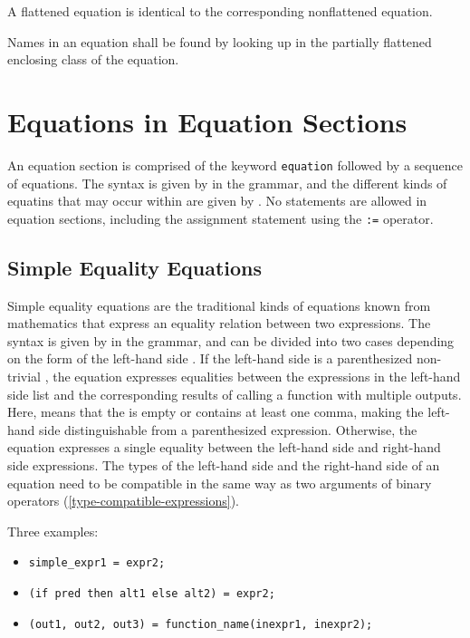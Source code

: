 A flattened equation is identical to the corresponding nonflattened equation.

Names in an equation shall be found by looking up in the partially flattened enclosing class of the equation.


\section{Equations in Equation Sections}\label{equations-in-equation-sections}

An equation section is comprised of the keyword \lstinline!equation! followed by a sequence of equations.
The syntax is given by  in the grammar, and the different kinds of equatins that may occur within are given by .
No statements are allowed in equation sections, including the assignment statement using the \lstinline!:=! operator.


\subsection{Simple Equality Equations}\label{simple-equality-equations}

Simple equality equations are the traditional kinds of equations known from mathematics that express an equality relation between two expressions.
The syntax is given by  in the grammar, and can be divided into two cases depending on the form of the left-hand side .
If the left-hand side is a parenthesized non-trivial , the equation expresses equalities between the expressions in the left-hand side list and the corresponding results of calling a function with multiple outputs.
Here,  means that the  is empty or contains at least one comma, making the left-hand side distinguishable from a parenthesized expression.
Otherwise, the equation expresses a single equality between the left-hand side and right-hand side expressions.
The types of the left-hand side and the right-hand side of an equation need to be compatible in the same way as two arguments of binary operators (\cref{type-compatible-expressions}).

Three examples:
\begin{itemize}
\item \lstinline!simple_expr1 = expr2;!
\item \lstinline!(if pred then alt1 else alt2) = expr2;!
\item \lstinline!(out1, out2, out3) = function_name(inexpr1, inexpr2);!
\end{itemize}

